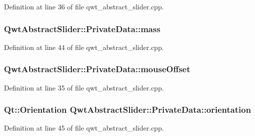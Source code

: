 Definition at line 36 of file qwt\-\_\-abstract\-\_\-slider.\-cpp.

\hypertarget{class_qwt_abstract_slider_1_1_private_data_a8c835192d3166a471b3837c7db9738e1}{
\subsubsection[{mass}]{ Qwt\-Abstract\-Slider\-::\-Private\-Data\-::mass}}\label{class_qwt_abstract_slider_1_1_private_data_a8c835192d3166a471b3837c7db9738e1}


Definition at line 44 of file qwt\-\_\-abstract\-\_\-slider.\-cpp.

\hypertarget{class_qwt_abstract_slider_1_1_private_data_a494ad246617972ec0194ad0fb2001cb8}{
\subsubsection[{mouse\-Offset}]{ Qwt\-Abstract\-Slider\-::\-Private\-Data\-::mouse\-Offset}}\label{class_qwt_abstract_slider_1_1_private_data_a494ad246617972ec0194ad0fb2001cb8}


Definition at line 35 of file qwt\-\_\-abstract\-\_\-slider.\-cpp.

\hypertarget{class_qwt_abstract_slider_1_1_private_data_abb9d547864f942e5183f551baf93b520}{
\subsubsection[{orientation}]{\setlength{\rightskip}{0pt plus 5cm}Qt\-::\-Orientation Qwt\-Abstract\-Slider\-::\-Private\-Data\-::orientation}}\label{class_qwt_abstract_slider_1_1_private_data_abb9d547864f942e5183f551baf93b520}


Definition at line 45 of file qwt\-\_\-abstract\-\_\-slider.\-cpp.

